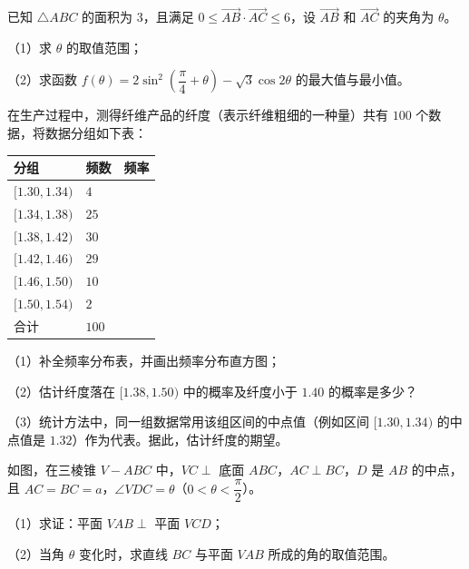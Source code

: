 \begingroup
\renewenvironment{question}{\Needspace{0.46\textheight}}{}
\begin{question}
已知 $\triangle ABC$ 的面积为 $3$，且满足 $0\leqslant\overrightarrow{AB}\cdot\overrightarrow{AC}\leqslant6$，设 $\overrightarrow{AB}$ 和 $\overrightarrow{AC}$ 的夹角为 $\theta$。

（1）求 $\theta$ 的取值范围；

（2）求函数 $f(\theta)=2\sin^2\left(\dfrac{\pi}4+\theta\right)-\sqrt3\cos2\theta$ 的最大值与最小值。

\Needspace{0.4\textheight}
\end{question}
\endgroup
\begingroup
\renewenvironment{question}{\Needspace{0.42\textheight}}{}
\begin{question}
在生产过程中，测得纤维产品的纤度（表示纤维粗细的一种量）共有 $100$ 个数据，将数据分组如下表：

\begin{center}
\begin{tabular}{lll}
\toprule
分组 & 频数 & 频率 \\
\midrule
$[1.30,1.34)$ & $4$ &  \\
$[1.34,1.38)$ & $25$ &  \\
$[1.38,1.42)$ & $30$ &  \\
$[1.42,1.46)$ & $29$ &  \\
$[1.46,1.50)$ & $10$ &  \\
$[1.50,1.54)$ & $2$ &  \\
合计 & $100$ &  \\
\bottomrule
\end{tabular}
\end{center}

（1）补全频率分布表，并画出频率分布直方图；

（2）估计纤度落在 $[1.38,1.50)$ 中的概率及纤度小于 $1.40$ 的概率是多少？

（3）统计方法中，同一组数据常用该组区间的中点值（例如区间 $[1.30,1.34)$ 的中点值是 $1.32$）作为代表。据此，估计纤度的期望。
\nopagebreak[4]
\begin{center}\end{center}
\nopagebreak[4]
\Needspace{0.4\textheight}
\end{question}
\endgroup
\begingroup
\renewenvironment{question}{\Needspace{0.42\textheight}}{}
\begin{question}
如图，在三棱锥 $V-ABC$ 中，$VC\perp$ 底面 $ABC$，$AC\perp BC$，$D$ 是 $AB$ 的中点，且 $AC=BC=a$，$\angle VDC=\theta$（$0<\theta<\dfrac{\pi}2$）。

（1）求证：平面 $VAB\perp$ 平面 $VCD$；

（2）当角 $\theta$ 变化时，求直线 $BC$ 与平面 $VAB$ 所成的角的取值范围。
\nopagebreak[4]
\begin{center}\end{center}
\nopagebreak[4]
\Needspace{0.4\textheight}
\end{question}
